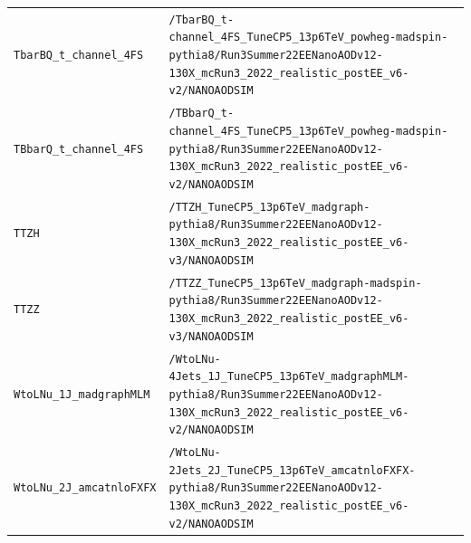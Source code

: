 \begin{longtable}{@{}>{\RaggedRight\arraybackslash}p{} >{\RaggedRight\arraybackslash}p{}@{}}
\addlinespace[2pt]
\texttt{TbarBQ\_\allowbreak{}t\_\allowbreak{}channel\_\allowbreak{}4FS} & \texttt{/\allowbreak{}TbarBQ\_\allowbreak{}t-\allowbreak{}channel\_\allowbreak{}4FS\_\allowbreak{}TuneCP5\_\allowbreak{}13p6TeV\_\allowbreak{}powheg-\allowbreak{}madspin-\allowbreak{}pythia8/\allowbreak{}Run3Summer22EENanoAODv12-\allowbreak{}130X\_\allowbreak{}mcRun3\_\allowbreak{}2022\_\allowbreak{}realistic\_\allowbreak{}postEE\_\allowbreak{}v6-\allowbreak{}v2/\allowbreak{}NANOAODSIM} \\
\addlinespace[2pt]
\texttt{TBbarQ\_\allowbreak{}t\_\allowbreak{}channel\_\allowbreak{}4FS} & \texttt{/\allowbreak{}TBbarQ\_\allowbreak{}t-\allowbreak{}channel\_\allowbreak{}4FS\_\allowbreak{}TuneCP5\_\allowbreak{}13p6TeV\_\allowbreak{}powheg-\allowbreak{}madspin-\allowbreak{}pythia8/\allowbreak{}Run3Summer22EENanoAODv12-\allowbreak{}130X\_\allowbreak{}mcRun3\_\allowbreak{}2022\_\allowbreak{}realistic\_\allowbreak{}postEE\_\allowbreak{}v6-\allowbreak{}v2/\allowbreak{}NANOAODSIM} \\
\addlinespace[2pt]
\texttt{TTZH} & \texttt{/\allowbreak{}TTZH\_\allowbreak{}TuneCP5\_\allowbreak{}13p6TeV\_\allowbreak{}madgraph-\allowbreak{}pythia8/\allowbreak{}Run3Summer22EENanoAODv12-\allowbreak{}130X\_\allowbreak{}mcRun3\_\allowbreak{}2022\_\allowbreak{}realistic\_\allowbreak{}postEE\_\allowbreak{}v6-\allowbreak{}v3/\allowbreak{}NANOAODSIM} \\
\addlinespace[2pt]
\texttt{TTZZ} & \texttt{/\allowbreak{}TTZZ\_\allowbreak{}TuneCP5\_\allowbreak{}13p6TeV\_\allowbreak{}madgraph-\allowbreak{}madspin-\allowbreak{}pythia8/\allowbreak{}Run3Summer22EENanoAODv12-\allowbreak{}130X\_\allowbreak{}mcRun3\_\allowbreak{}2022\_\allowbreak{}realistic\_\allowbreak{}postEE\_\allowbreak{}v6-\allowbreak{}v3/\allowbreak{}NANOAODSIM} \\
\addlinespace[2pt]
\texttt{WtoLNu\_\allowbreak{}1J\_\allowbreak{}madgraphMLM} & \texttt{/\allowbreak{}WtoLNu-\allowbreak{}4Jets\_\allowbreak{}1J\_\allowbreak{}TuneCP5\_\allowbreak{}13p6TeV\_\allowbreak{}madgraphMLM-\allowbreak{}pythia8/\allowbreak{}Run3Summer22EENanoAODv12-\allowbreak{}130X\_\allowbreak{}mcRun3\_\allowbreak{}2022\_\allowbreak{}realistic\_\allowbreak{}postEE\_\allowbreak{}v6-\allowbreak{}v2/\allowbreak{}NANOAODSIM} \\
\addlinespace[2pt]
\texttt{WtoLNu\_\allowbreak{}2J\_\allowbreak{}amcatnloFXFX} & \texttt{/\allowbreak{}WtoLNu-\allowbreak{}2Jets\_\allowbreak{}2J\_\allowbreak{}TuneCP5\_\allowbreak{}13p6TeV\_\allowbreak{}amcatnloFXFX-\allowbreak{}pythia8/\allowbreak{}Run3Summer22EENanoAODv12-\allowbreak{}130X\_\allowbreak{}mcRun3\_\allowbreak{}2022\_\allowbreak{}realistic\_\allowbreak{}postEE\_\allowbreak{}v6-\allowbreak{}v2/\allowbreak{}NANOAODSIM} \\

\end{longtable}
